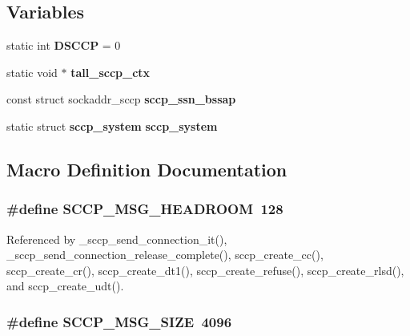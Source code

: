 \subsection*{Variables}
\begin{DoxyCompactItemize}
\item 
static int {\bf D\+S\+C\+CP} = 0
\item 
static void $\ast$ {\bf tall\+\_\+sccp\+\_\+ctx}
\item 
const struct sockaddr\+\_\+sccp {\bf sccp\+\_\+ssn\+\_\+bssap}
\item 
static struct {\bf sccp\+\_\+system} {\bf sccp\+\_\+system}
\end{DoxyCompactItemize}


\subsection{Macro Definition Documentation}
\subsubsection[{S\+C\+C\+P\+\_\+\+M\+S\+G\+\_\+\+H\+E\+A\+D\+R\+O\+OM}]{\setlength{\rightskip}{0pt plus 5cm}\#define S\+C\+C\+P\+\_\+\+M\+S\+G\+\_\+\+H\+E\+A\+D\+R\+O\+OM~128}\label{sccp_8c_a93c1b4187877d6a16a64487da38aa772}


Referenced by \+\_\+sccp\+\_\+send\+\_\+connection\+\_\+it(), \+\_\+sccp\+\_\+send\+\_\+connection\+\_\+release\+\_\+complete(), sccp\+\_\+create\+\_\+cc(), sccp\+\_\+create\+\_\+cr(), sccp\+\_\+create\+\_\+dt1(), sccp\+\_\+create\+\_\+refuse(), sccp\+\_\+create\+\_\+rlsd(), and sccp\+\_\+create\+\_\+udt().

\subsubsection[{S\+C\+C\+P\+\_\+\+M\+S\+G\+\_\+\+S\+I\+ZE}]{\setlength{\rightskip}{0pt plus 5cm}\#define S\+C\+C\+P\+\_\+\+M\+S\+G\+\_\+\+S\+I\+ZE~4096}\label{sccp_8c_a95dfedb93a29d464768e61be0054b120}


